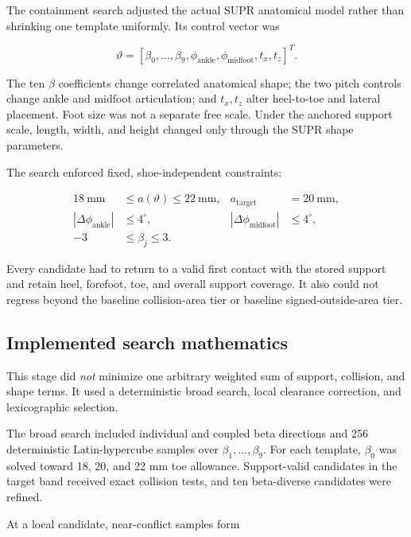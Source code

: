 \documentclass[11pt]{article}
\begin{document}
The containment search adjusted the actual SUPR anatomical model rather than shrinking
one template uniformly. Its control vector was

\begin{equation}
  \vartheta=
  [\beta_0,\ldots,\beta_9,
  \phi_{\mathrm{ankle}},\phi_{\mathrm{midfoot}},t_x,t_z]^T.
  \label{eq:containment-parameters}
\end{equation}

The ten $\beta$ coefficients change correlated anatomical shape; the two pitch controls
change ankle and midfoot articulation; and $t_x,t_z$ alter heel-to-toe and lateral
placement. Foot size was not a separate free scale. Under the anchored support scale,
length, width, and height changed only through the SUPR shape parameters.

The search enforced fixed, shoe-independent constraints:

\begin{align}
  18\ \mathrm{mm} &\le a(\vartheta)\le 22\ \mathrm{mm},
  &a_{\mathrm{target}}&=20\ \mathrm{mm},\\
  |\Delta\phi_{\mathrm{ankle}}|&\le 4^\circ,
  &|\Delta\phi_{\mathrm{midfoot}}|&\le 4^\circ,\\
  -3&\le \beta_j\le 3.
\end{align}

Every candidate had to return to a valid first contact with the stored support and retain
heel, forefoot, toe, and overall support coverage. It also could not regress beyond the
baseline collision-area tier or baseline signed-outside-area tier.

\subsection{Implemented search mathematics}

This stage did \emph{not} minimize one arbitrary weighted sum of support, collision,
and shape terms. It used a deterministic broad search, local clearance correction, and
lexicographic selection.

The broad search included individual and coupled beta directions and 256 deterministic
Latin-hypercube samples over $\beta_1,\ldots,\beta_9$. For each template, $\beta_0$ was
solved toward 18, 20, and 22 mm toe allowance. Support-valid candidates in the target
band received exact collision tests, and ten beta-diverse candidates were refined.

At a local candidate, near-conflict samples form
\end{document}
